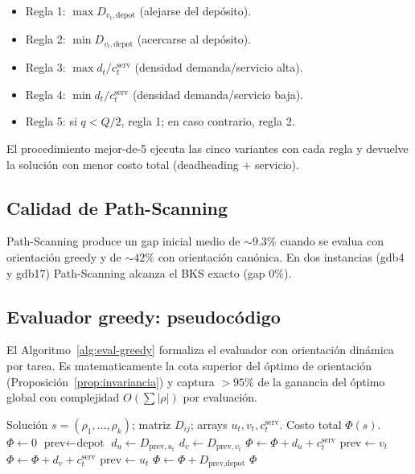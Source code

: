 \documentclass[11pt,a4paper]{article}
\theoremstyle{definition}
\theoremstyle{remark}
\begin{document}
\begin{itemize}
\item Regla 1: $\max D_{v_t, \text{depot}}$ (alejarse del depósito).
\item Regla 2: $\min D_{v_t, \text{depot}}$ (acercarse al depósito).
\item Regla 3: $\max d_t / c_t^{\text{serv}}$ (densidad demanda/servicio alta).
\item Regla 4: $\min d_t / c_t^{\text{serv}}$ (densidad demanda/servicio baja).
\item Regla 5: si $q < Q/2$, regla 1; en caso contrario, regla 2.
\end{itemize}

El procedimiento mejor-de-5 ejecuta las cinco variantes con cada regla
y devuelve la solución con menor costo total (deadheading + servicio).

\subsection{Calidad de Path-Scanning}

Path-Scanning produce un gap inicial medio de $\sim 9.3\%$ cuando se
evalua con orientación greedy y de $\sim 42\%$ con orientación
canónica. En dos instancias (gdb4 y gdb17) Path-Scanning alcanza el
BKS exacto (gap 0\%).

\subsection{Evaluador greedy: pseudocódigo}

El Algoritmo~\ref{alg:eval-greedy} formaliza el evaluador con
orientación dinámica por tarea. Es matematicamente la cota superior
del óptimo de orientación (Proposición~\ref{prop:invariancia}) y
captura $> 95\%$ de la ganancia del óptimo global con complejidad
$O(\sum |\rho|)$ por evaluación.

\begin{algorithm}[h]
\caption{Evaluador greedy con orientación dinámica por tarea.}
\label{alg:eval-greedy}
\begin{algorithmic}[1]
\Require Solución $s = (\rho_1, \dots, \rho_k)$; matriz $D_{ij}$;
  arrays $u_t, v_t, c_t^{\text{serv}}$.
\Ensure Costo total $\Phi(s)$.
\State $\Phi \gets 0$
  \State $\text{prev} \gets \text{depot}$
    \State $d_u \gets D_{\text{prev}, u_t}$
    \State $d_v \gets D_{\text{prev}, v_t}$
     
      \State $\Phi \gets \Phi + d_u + c_t^{\text{serv}}$
      \State $\text{prev} \gets v_t$
    \Else {}
      \State $\Phi \gets \Phi + d_v + c_t^{\text{serv}}$
      \State $\text{prev} \gets u_t$
    \EndIf
  \EndFor
  \State $\Phi \gets \Phi + D_{\text{prev}, \text{depot}}$
\EndFor
\State \Return $\Phi$
\end{algorithmic}
\end{algorithm}
\end{document}
